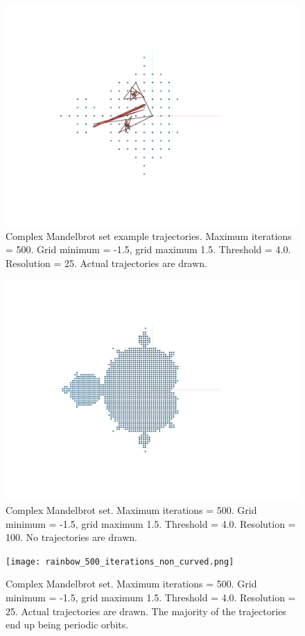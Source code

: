 \documentclass[12pt]{article}
\begin{document}
\begin{figure} 
\centering
  \includegraphics[width = 5 in]{sample_trajectories.png}	
  \caption{Complex Mandelbrot set example trajectories.
Maximum iterations = 500.
Grid minimum = -1.5, grid maximum 1.5.
Threshold = 4.0.
Resolution = 25.
Actual trajectories are drawn.
}
\end{figure}


\begin{figure} 
\centering
  \includegraphics[width = 5 in]{set2.png}	
  \caption{Complex Mandelbrot set.
Maximum iterations = 500.
Grid minimum = -1.5, grid maximum 1.5.
Threshold = 4.0.
Resolution = 100.
No trajectories are drawn.
}
\end{figure}


\begin{figure} 
\centering
  \texttt{[image: rainbow\_500\_iterations\_non\_curved.png]}	
  \caption{Complex Mandelbrot set.
Maximum iterations = 500.
Grid minimum = -1.5, grid maximum 1.5.
Threshold = 4.0.
Resolution = 25.
Actual trajectories are drawn.
The majority of the trajectories end up being periodic orbits.}
\end{figure}
\end{document}
